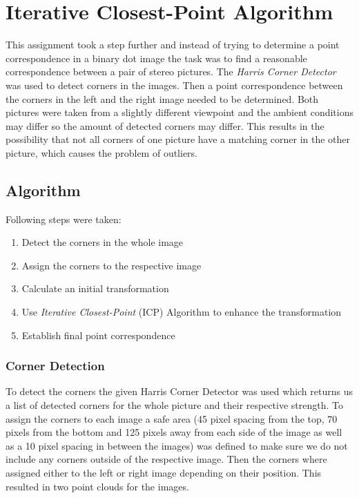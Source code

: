 \chapter{Iterative Closest-Point Algorithm}

This assignment took a step further and instead of trying to determine a point correspondence in a binary dot image the task was to find a reasonable correspondence between a pair of stereo pictures.
The \textit{Harris Corner Detector}\cite{Harris2020} was used to detect corners in the images. Then a point correspondence between the corners in the left and the right image needed to be determined. Both pictures were taken from a slightly different viewpoint and the ambient conditions may differ so the amount of detected corners may differ. This results in the possibility that not all corners of one picture have a matching corner in the other picture, which causes the problem of outliers. 


\section{Algorithm}

Following steps were taken:

\begin{enumerate}
	\item Detect the corners in the whole image
	\item Assign the corners to the respective image
	\item Calculate an initial transformation
	\item Use \textit{Iterative Closest-Point} (ICP) Algorithm to enhance the transformation
	\item Establish final point correspondence
\end{enumerate}

\subsection{Corner Detection}
To detect the corners the given Harris Corner Detector was used which returns us a list of detected corners for the whole picture and their respective strength. To assign the corners to each image a safe area (45 pixel spacing from the top, 70 pixels from the bottom and 125 pixels away from each side of the image as well as a 10 pixel spacing in between the images) was defined to make sure we do not include any corners outside of the respective image. Then the corners where assigned either to the left or right image depending on their position. This resulted in two point clouds for the images.

